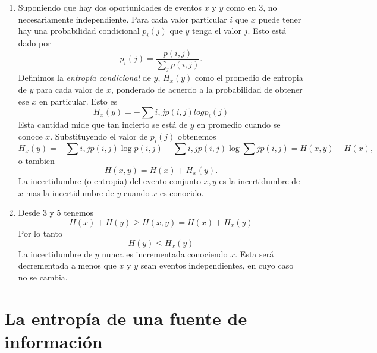 \begin{enumerate}
\item{Suponiendo que hay dos oportunidades de eventos $x$ y $y$ como
  en 3, no necesariamente independiente. Para cada valor particular
  $i$ que $x$ puede tener hay una probabilidad condicional $p_{i}(j)$
  que $y$ tenga el valor $j$. Esto est\'{a} dado por
\begin{equation}
p_{i}(j) = \frac{p(i,j)}{\sum_{j}p(i,j)}.
\end{equation}
Definimos la \textit{entrop\'{i}a condicional} de $y$, $H_{x}(y)$ como el promedio de entropia de $y$ para cada valor de $x$, ponderado de acuerdo a la probabilidad de obtener ese $x$ en particular. Esto es
\begin{equation}
  H_{x}(y) = -\sum{i,j} p(i,j)logp_{i}(j)
\end{equation}
Esta cantidad mide que tan incierto se est\'{a} de $y$ en promedio cuando se conoce $x$. Substituyendo el valor de $p_{i}(j)$ obtenemos
\begin{equation}
  H_{x}(y) = -\sum{i,j}{}p(i,j) \log p(i,j) + \sum{i,j}{}p(i,j)\log\sum{j}{}p(i,j) = H(x,y) - H(x),
\end{equation}
o tambien
\begin{equation}
H(x,y) = H(x) + H_{x}(y).
\end{equation}
La incertidumbre (o entropia) del evento conjunto $x,y$ es la incertidumbre de $x$ mas la incertidumbre de $y$ cuando $x$ es conocido.}
\item{Desde 3 y 5 tenemos
\begin{equation}
H(x) + H(y) \geq H(x,y) = H(x) + H_{x}(y)
\end{equation}
Por lo tanto
\begin{equation}
H(y) \leq H_{x}(y)
\end{equation}
La incertidumbre de $y$ nunca es incrementada conociendo $x$. Esta
ser\'{a} decrementada a menos que $x$ y $y$ sean eventos
independientes, en cuyo caso no se cambia.}
\end{enumerate}

\clearpage

\chapter{La entrop\'{i}a de una fuente de informaci\'{o}n}
\label{sec:7}

